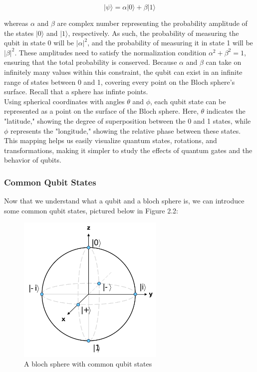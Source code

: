  \vspace{0.01cm} 
\large
\begin{equation}
  |\psi\rangle = \alpha |0\rangle + \beta |1\rangle
\end{equation}
\normalsize 
\vspace{0.01cm} 

whereas $\alpha$ and $\beta$ are complex number representing the probability amplitude of the states $|0\rangle$ and $|1\rangle$, respectively. As such, the probability of measuring the qubit in state 0 will be $|\alpha|^2$, and the probability of measuring it in state 1 will be $|\beta|^2$. These amplitudes need to satisfy the normalization condition $\alpha^2 + \beta^2 = 1$, ensuring that the total probability is conserved.  Because $\alpha$ and $\beta$ can take on infinitely many values within this constraint, the qubit can exist in an infinite range of states between 0 and 1, covering every point on the Bloch sphere’s surface. Recall that a sphere has infinte points.\\ 

Using spherical coordinates with angles $\theta$ and $\phi$, each qubit state can be represented as a point on the surface of the Bloch sphere. Here, $\theta$ indicates the "latitude," showing the degree of superposition between the 0 and 1 states, while $\phi$ represents the "longitude," showing the relative phase between these states. This mapping helps us easily visualize quantum states, rotations, and transformations, making it simpler to study the effects of quantum gates and the behavior of qubits. 


\subsubsection*{Common Qubit States}

Now that we understand what a qubit and a bloch sphere is, we can introduce some common qubit states, pictured below in Figure 2.2:

\begin{figure}[ht]
\centering
\includegraphics[width=7cm]{images/commonstatesbloch.png}
\caption{A bloch sphere with common qubit states}
\end{figure}

